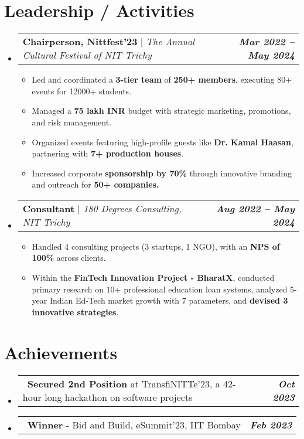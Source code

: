 \documentclass[letterpaper,11pt]{article}
\makeatletter
\newcommand{\resumeProjectHeading}[2]{
    \item
    \begin{tabular*}{0.97\textwidth}{l@{\extracolsep{\fill}}r}
      \small#1 & \textit{\textbf{\small#2}} \\
    \end{tabular*}\vspace{-7pt}
}
\newcommand{\achievement}[2]{
    \item \small
    \begin{tabular*}{0.97\textwidth}{l@{\extracolsep{\fill}}r}
      {\small \textbullet\ #1} & \textit{\textbf{\small#2}} \\
    \end{tabular*}\vspace{-7pt}
}
\newcommand{\resumeItem}[1]{
  \item\small{
    {#1 \vspace{-2pt}}
  }
}
\newcommand{\resumeSubHeadingListStart}{\begin{itemize}[leftmargin=0.15in, label={}]}
\newcommand{\resumeSubHeadingListEnd}{\end{itemize}}
\newcommand{\resumeItemListStart}{\begin{itemize}}
\newcommand{\resumeItemListEnd}{\end{itemize}\vspace{-5pt}}
\makeatother
\begin{document}
\section{Leadership / Activities}
    \resumeSubHeadingListStart
      \resumeProjectHeading
          {\textbf{Chairperson, Nittfest’23} $|$ \emph{The Annual Cultural Festival of NIT Trichy}}{Mar 2022 -- May 2024}
          \resumeItemListStart
            \resumeItem{Led and coordinated a \textbf{3-tier team} of \textbf{250+ members}, executing 80+ events for 12000+ students.}
            \resumeItem{Managed a \textbf{75 lakh INR }budget with strategic marketing, promotions, and risk management.}
            \resumeItem{Organized events featuring high-profile guests like \textbf{Dr. Kamal Haasan}, partnering with \textbf{7+ production houses}.}
            \resumeItem{Increased corporate \textbf{sponsorship by 70\%} through innovative branding and outreach for \textbf{50+ companies.}}
          \resumeItemListEnd

      \resumeProjectHeading
          {\textbf{Consultant} $|$ \emph{180 Degrees Consulting, NIT Trichy}}{Aug 2022 -- May 2024}
          \resumeItemListStart
            \resumeItem{Handled 4 consulting projects (3 startups, 1 NGO), with an \textbf{NPS of 100\%} across clients.}
            \resumeItem{Within the \textbf{FinTech Innovation Project - BharatX}, conducted primary research on 10+ professional education loan systems, analyzed 5-year Indian Ed-Tech market growth with 7 parameters, and \textbf{devised 3 innovative strategies}.}
          \resumeItemListEnd
    \resumeSubHeadingListEnd


\section{Achievements}
    \resumeSubHeadingListStart
        \achievement
        {\textbf{Secured 2nd Position} at TransfiNITTe’23, a 42-hour long hackathon on software projects}{Oct 2023}
        
        \achievement
        {\textbf{Winner} - Bid and Build, eSummit’23, IIT Bombay}{Feb 2023}
    \resumeSubHeadingListEnd


\end{document}
